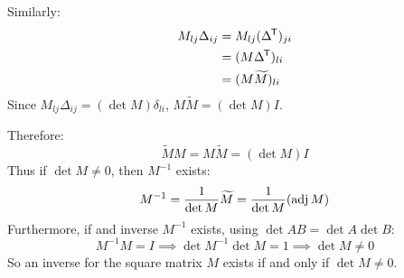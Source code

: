 \documentclass[../main.tex]{subfiles}
\begin{document}
Similarly:
\begin{align*}
  M_{l j}\Delta_{i j} &= M_{l j}(\Delta^{{\mkern-1.5mu\mathsf{T}}})_{j i} \\
                      &= (M \Delta^{{\mkern-1.5mu\mathsf{T}}})_{l i} \\
                      &= (M \widetilde{M})_{l i}
\end{align*}
Since $M_{l j}\Delta_{i j} = (\det M)\delta_{l i}$, $M \widetilde{M} = (\det M)I$.

Therefore:
\[
  \widetilde{M} M = M \widetilde{M} = (\det M)I
\]
Thus if $\det M \neq 0$, then $M^{-1}$ exists:
\[
  M^{-1} = \frac{1}{\det M}\widetilde{M} = \frac{1}{\det M}(\operatorname{adj} M)
\]
Furthermore, if and inverse $M^{-1}$ exists, using $\det AB = \det A \det B$:
\[
  M^{-1} M = I \implies \det M^{-1} \det M = 1 \implies \det M \neq 0
\]
So an inverse for the square matrix $M$ exists if and only if $\det M \neq 0$.
\end{document}
